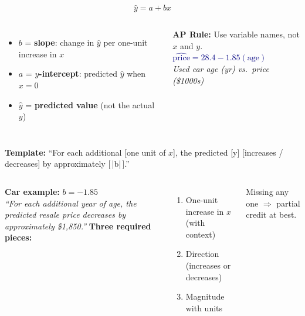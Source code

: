 \documentclass[aspectratio=169, 11pt]{beamer}
\begin{document}
\begin{frame}[t, plain]
  \vspace{0.3cm}
  \vspace{0.2cm}
  \[
    \hat{y} = a + bx
  \]
  \begin{columns}
      \begin{itemize}
        \item $b$ = \textbf{slope}: change in $\hat{y}$ per one-unit increase in $x$
        \item $a$ = \textbf{$y$-intercept}: predicted $\hat{y}$ when $x = 0$
        \item $\hat{y}$ = \textbf{predicted value} (not the actual $y$)
      \end{itemize}
      \textbf{AP Rule:} Use variable names, not $x$ and $y$.\\[8pt]
      \textcolor{navy}{$\widehat{\text{price}} = 28.4 - 1.85(\text{age})$}\\[4pt]
      \small\textit{Used car age (yr) vs.\ price (\$1000s)}
  \end{columns}
\end{frame}

\begin{frame}[t, plain]
  \vspace{0.25cm}
  \vspace{0.15cm}
  \textbf{Template:} ``For each additional [one unit of $x$], the predicted [y] [increases /
  decreases] by approximately [\,|b|\,].''
  \vspace{0.3cm}
  \begin{columns}
      \textbf{Car example:} $b = -1.85$\\[8pt]
      \textit{``For each additional year of age, the predicted resale price decreases by
      approximately \$1{,}850.''}
      \textbf{Three required pieces:}
      \begin{enumerate}
        \item One-unit increase in $x$ (with context)
        \item Direction (increases or decreases)
        \item Magnitude with units
      \end{enumerate}
      \vspace{4pt}
      \textcolor{redacc}{\small Missing any one $\Rightarrow$ partial credit at best.}
  \end{columns}
\end{frame}
\end{document}
